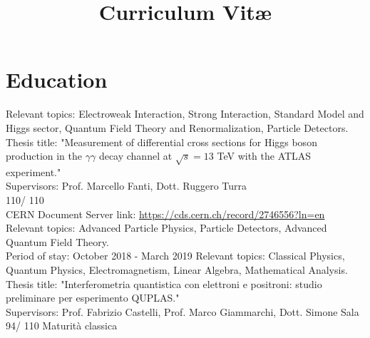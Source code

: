 \documentclass[11pt,a4paper,roman]{moderncv}        %
\title{Curriculum Vit\ae}                               %
\begin{document}
\makecvtitle
\section{Education}
{Relevant topics: Electroweak Interaction, Strong Interaction, Standard Model and Higgs sector, Quantum Field Theory and Renormalization, Particle Detectors. \\
Thesis title: "Measurement of differential cross sections for Higgs boson production in the $\gamma\gamma$ decay channel at $\sqrt{s} = 13$ TeV with the ATLAS experiment." \\
Supervisors: Prof. Marcello Fanti, Dott. Ruggero Turra \\
110/ 110 \\
\newline CERN Document Server link: \url{https://cds.cern.ch/record/2746556?ln=en}}
{Relevant topics: Advanced Particle Physics, Particle Detectors, Advanced Quantum Field Theory. \\
Period of stay:  October 2018 - March 2019}
{Relevant topics: Classical Physics, Quantum Physics, Electromagnetism, Linear Algebra, Mathematical Analysis. \\ 
Thesis title: "Interferometria quantistica con elettroni e positroni: studio preliminare per esperimento QUPLAS." \\
Supervisors: Prof. Fabrizio Castelli, Prof. Marco Giammarchi, Dott. Simone Sala \\
94/ 110}
{Maturità classica}
\end{document}
